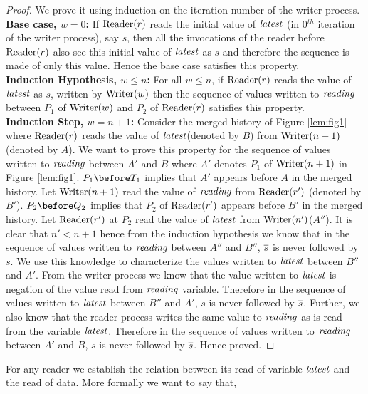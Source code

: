 \begin{description}
\begin{proof}
We prove it using induction on the iteration number of the writer process. \\
\textbf{Base case, $w=0$:} If $\mathrm{Reader}(r)$ reads the initial value of $\mathit{latest}$ (in 0$^{th}$ iteration of the writer process), say $s$, then all the invocations of the reader before $\mathrm{Reader}(r)$ also see this initial value of $\mathit{latest}$ as $s$ and therefore the sequence is made of only this value. Hence the base case satisfies this property.\\
\textbf{Induction Hypothesis, $w\le n$:} For all $w\le n$, if $\mathrm{Reader}(r)$ reads the value of $\mathit{latest}$ as $s$, written by $\mathrm{Writer}(w)$ then the sequence of values written to $\mathit{reading}$ between 
$P_1$ of $\mathrm{Writer}(w)$ and $P_2$ of $\mathrm{Reader}(r)$ satisfies this property.\\
\textbf{Induction Step, $w=n+1$:} Consider the merged history of Figure \ref{lem:fig1} where $\mathrm{Reader}(r)$ reads the value of $\mathit{latest}$(denoted by $B$) from $\mathrm{Writer}(n+1)$ (denoted by $A$). We want to prove this property for the sequence of values written to $\mathit{reading}$ between $A'$ and $B$ where $A'$ denotes $P_1$ of $\mathrm{Writer}(n+1)$ in Figure \ref{lem:fig1}. \ul{$P_1\before T_1$} implies that $A'$ appears before $A$ in the merged history. Let $\mathrm{Writer}(n+1)$ read the value of $\mathit{reading}$ from $\mathrm{Reader}(r')$ (denoted by $B'$). \ul{$P_2\before Q_2$} implies that $P_2$ of $\mathrm{Reader}(r')$ appears before $B'$ in the merged history. Let $\mathrm{Reader}(r')$ at $P_2$ read the value of $\mathit{latest}$ from $\mathrm{Writer}(n')$($A''$). It is clear that $n'<n+1$ hence from the induction hypothesis we know that in the sequence of values written to $\mathit{reading}$ between $A''$ and $B''$, $\overline{s}$ is never followed by $s$. We use this knowledge to characterize the values written to $\mathit{latest}$ between $B''$ and $A'$. From the writer process we know that the value written to $\mathit{latest}$ is negation of the value read from $\mathit{reading}$ variable. Therefore in the sequence of values written to $\mathit{latest}$ between $B''$ and $A'$, $s$ is never followed by $\overline{s}$. Further, we also know that the reader process writes the same value to $\mathit{reading}$ as is read from the  variable $\mathit{latest}$. Therefore in the sequence of values written to $\mathit{reading}$ between $A'$ and $B$, $s$ is never followed by $\overline{s}$. Hence proved.
\end{proof}
 For any reader we establish the relation between its read of variable $\mathit{latest}$ and the read of data. More formally we want to say that,
\begin{lemma}\label{finalaim}

\end{lemma}
\end{description}
